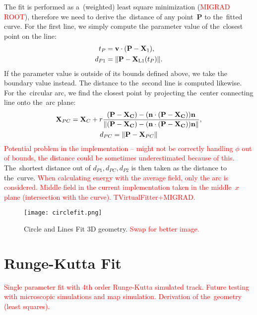 			The fit is performed as a~(weighted) least square minimization (\textcolor{red}{MIGRAD ROOT}), therefore we need to derive the~distance of any point~$\mathbf{P}$ to the~fitted curve. For the first line, we simply compute the parameter value of the~closest point on the line:
				\begin{align}
					t_P &= \mathbf{v}\cdot(\mathbf{P}-\mathbf{X}_1),\\
					d_{P1} &= \norm{\mathbf{P}-\mathbf{X}_\text{L1}(t_P)}.
				\end{align}
			If the parameter value is outside of its bounds defined above, we take the boundary value instead. The distance to the~second line is computed likewise. For the~circular arc, we find the closest point by projecting the~center connecting line onto the~arc plane:
				\begin{gather}
					\mathbf{X}_{PC} = \mathbf{X}_C + r\frac{(\mathbf{P-\mathbf{X}_C})-(\mathbf{n}\cdot(\mathbf{P-\mathbf{X}_C}))\mathbf{n}}{\norm{(\mathbf{P-\mathbf{X}_C})-(\mathbf{n}\cdot(\mathbf{P-\mathbf{X}_C}))\mathbf{n}}},\\
					d_{PC} = \norm{\mathbf{P}-\mathbf{X}_{PC}}
				\end{gather}
			\textcolor{red}{Potential problem in the implementation -- might not be correctly handling $\phi$ out of bounds, the distance could be sometimes underestimated because of this.} The~shortest distance out of $d_{P1},d_{PC},d_{P2}$ is then taken as the distance to the~curve. \textcolor{red}{When calculating energy with the average field, only the arc is considered. Middle field in the current implementation taken in the middle~$x$ plane (intersection with the curve). TVirtualFitter+MIGRAD. }
			
			\begin{figure}
				\centering
				\texttt{[image: circlefit.png]}
				\caption{Circle and Lines Fit 3D geometry. \textcolor{red}{Swap for better image.}}
				\label{fig:circlefit}
			\end{figure}
	
	\section{Runge-Kutta Fit}
		\textcolor{red}{Single parameter fit with 4th order Runge-Kutta simulated track. Future testing with microscopic simulations and map simulation. Derivation of the~geometry (least squares).}